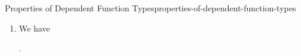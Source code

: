 \begin{proposition}{Properties of Dependent Function Types}{properties-of-dependent-function-types}
\begin{enumerate}
\begin{enumerate}
\begin{scalewebprooftree}
                        .%
                    \end{scalewebprooftree}%
                \item\label{properties-of-function-types-changing-the-order-of-arguments-1}We have
                    \begin{scalewebprooftree}%
                        \begin{prooftree}%
                        \end{prooftree}%
                        .%
                    \end{scalewebprooftree}%
            \end{enumerate}
    \end{enumerate}
\end{proposition}
